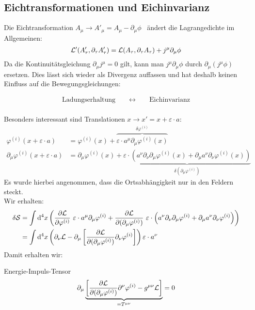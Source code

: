 \subsection{Eichtransformationen und Eichinvarianz}
Die Eichtransformation $A_{\mu} \rightarrow A'_{\mu} = A_{\mu} - \partial_{\mu}\phi$ \ ändert die Lagrangedichte im Allgemeinen:
\begin{align}
\mathcal{L}'(A'_{\tau},\partial_{\tau}A'_{\tau}) = \mathcal{L}(A_{\tau},\partial_{\tau}A_{\tau})+ j^{\mu}\partial_{\mu}\phi
\end{align}
Da die Kontinuitätsgleichung $\partial_{\mu}j^{\mu}=0$ gilt, kann man $j^{\mu}\partial_{\mu}\phi$ durch $\partial_{\mu}(j^{\mu}\phi)$ ersetzen.
Dies lässt sich wieder als Divergenz auffassen und hat deshalb keinen Einfluss auf die Bewegungsgleichungen:

\begin{align*}
\text{Ladungserhaltung} \qquad \longleftrightarrow \qquad \text{Eichinvarianz}
\end{align*}
\\
Besonders interessant sind Translationen $x \rightarrow x' = x + \varepsilon \cdot a$: 
\begin{align*}
\varphi^{(i)}(x + \varepsilon \cdot a) &= \varphi^{(i)}(x) + \overbrace{\varepsilon\cdot a^{\mu}\partial_{\mu}\varphi^{(i)}(x)}^{\delta\varphi^{(i)}} \\
\partial_{\mu}\varphi^{(i)}(x + \varepsilon \cdot a) &= \partial_{\mu}\varphi^{(i)}(x) + \underbrace{\varepsilon\cdot\left(a^{\nu}\partial_{\nu}\partial_{\mu}\varphi^{(i)}(x) + \partial_{\mu}a^{\nu}\partial_{\nu}\varphi^{(i)}(x)\right)}_{\delta(\partial_{\mu}\varphi^{(i)})} 
\end{align*}
Es wurde hierbei angenommen, dass die Ortsabhängigkeit nur in den Feldern steckt. \\
Wir erhalten:
\begin{align*}
\delta \mathcal{S} &= \int \dd[4]{x} \left( \dphi \ \varepsilon\cdot a^{\mu}\partial_{\mu}\varphi^{(i)} + \ddphi \ \varepsilon\cdot\left(a^{\nu}\partial_{\nu}\partial_{\mu}\varphi^{(i)}+\partial_{\mu}a^{\nu}\partial_{\nu}\varphi^{(i)}\right) \right) \\
&= \int \dd[4]{x} \left( \partial_{\nu}\lagr - \partial_{\mu} \left[\ddphi \partial_{\nu}\varphi^{(i)}\right] \right) \varepsilon\cdot a^{\nu}
\end{align*}
Damit erhalten wir:
\begin{mybox}{Energie-Impuls-Tensor}
\begin{align}
\partial_{\mu}\underbrace{\left[ \frac{\partial\mathcal{L}}{\partial(\partial_{\mu}\varphi^{(i)})} \partial^{\nu}\varphi^{(i)} - g^{\mu \nu}\mathcal{L} \right]}_{ = T^{\mu\nu}} = 0
\end{align}
\end{mybox}

